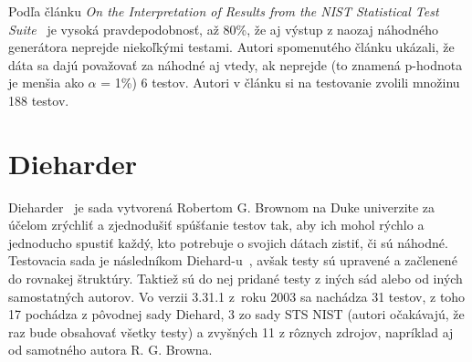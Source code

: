 Podľa článku \textit{On the Interpretation of Results from the NIST Statistical Test Suite}~\parencite{nist-sts-interpretation-syso} je vysoká pravdepodobnosť, až 80\%, že aj výstup z naozaj náhodného generátora neprejde niekoľkými testami. Autori spomenutého článku ukázali, že dáta sa dajú považovať za náhodné aj vtedy, ak neprejde (to znamená p-hodnota je menšia ako $\alpha$ = 1\%) 6 testov. Autori v článku si na testovanie zvolili množinu 188 testov.

\section{Dieharder}
\label{sec:dieharder}
Dieharder~\parencite{dieharder} je sada vytvorená Robertom G. Brownom na Duke univerzite za účelom zrýchliť a zjednodušiť spúšťanie testov tak, aby ich mohol rýchlo a jednoducho spustiť každý, kto potrebuje o svojich dátach zistiť, či sú náhodné. Testovacia sada je následníkom Diehard-u~\parencite{diehard}, avšak testy sú upravené a začlenené do rovnakej štruktúry. Taktiež sú do nej pridané testy z iných sád alebo od iných samostatných autorov. Vo verzii 3.31.1 z~roku 2003 sa nachádza 31 testov, z toho 17 pochádza z pôvodnej sady Diehard, 3 zo sady STS NIST (autori očakávajú, že raz bude obsahovať všetky testy) a zvyšných 11 z rôznych zdrojov, napríklad aj od samotného autora R. G. Browna.


